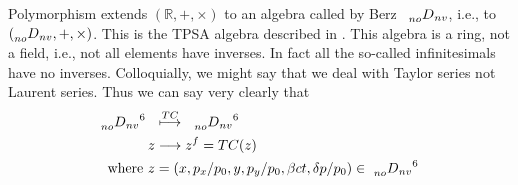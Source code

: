 \documentclass{hitec}     %
\begin{document}
Polymorphism extends $(\mathbb{R},+,\times)$ to an algebra called by Berz\cite{theberzbook} ~$\prescript{}{no}{D}_{nv} $, i.e., to $(\prescript{}{no}{D}_{nv} ,+,\times )$. This is the TPSA algebra described in  . This algebra is a ring, not a field, i.e., not all elements have inverses. In fact all the so-called infinitesimals have no inverses. Colloquially, we might say that we deal with Taylor series not Laurent series. Thus we can say very clearly that 
%
\begin{align}  {\prescript{}{no}{D}_{nv}}^{6}\ \ &\stackrel{TC}{\longmapsto}\ \ {\prescript{}{no}{D}_{nv}}^{6}  \\  z &\longrightarrow {z}^{f}=TC(z) \label{eq:ptcmap}\\~{\rm w}{\rm h}{\rm e}{\rm r}{\rm e}~z&=
\left({x,{p}_{x}/{p}_{0},y,{p}_{y}/{p}_{0},\beta ct,\delta p/{p}_{0}}\right)\in \ {\prescript{}{no}{D}_{nv}}^{6}\end{align}
\end{document}
